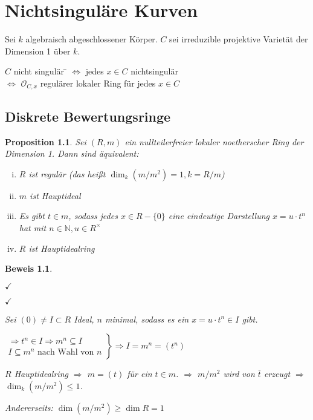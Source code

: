 \documentclass[a4paper, 12pt, numbers=noendperiod, chapterprefix=true, headsepline]{scrbook}
\theoremstyle{break}
\newtheorem{Prop}[Def]{Proposition}
\theoremstyle{nonumberbreak}
\newtheorem{Bew}{Beweis}
\theoremstyle{nonumberplain}
\newcommand{\N}{\mathbb{N}}
\newcommand{\calO}{\mathcal{O}}
\begin{document}
\newpage

\chapter{Nichtsingul\"are Kurven}
\setcounter{section}{19}
Sei $k$ algebraisch abgeschlossener K\"orper. $C$ sei irreduzible projektive Variet\"at der Dimension 1 \"uber $k$.
\begin{tabbing}
$C$ nicht singul\"ar \= $\Leftrightarrow$ jedes $x\in C$ nichtsingul\"ar\\
\> $\Leftrightarrow$ $\calO_{C,x}$ regul\"arer lokaler Ring f\"ur jedes $x\in C$
\end{tabbing}

\section{Diskrete Bewertungsringe}

\begin{Prop}\label{20.1}
Sei $(R,m)$ ein nullteilerfreier lokaler noetherscher Ring der Dimension 1. Dann sind \"aquivalent:\begin{enumerate}[i)]
\item
	$R$ ist regul\"ar (das hei\ss t $\dim_k(m/m^2)=1, k=R/m$)
\item
	$m$ ist Hauptideal
\item
	Es gibt $t\in m$, sodass jedes $x\in R-\{0\}$ eine eindeutige Darstellung $x=u\cdot t^n$ hat mit $n\in \N, u\in R^\times$
\item
	$R$ ist Hauptidealring
\end{enumerate}\end{Prop}

\begin{Bew}\begin{description}[\setlabelstyle{\normalfont}]
\item[(i)$\Rightarrow$(ii):]$\checkmark$
\item[(ii)$\Rightarrow$(iii):]$\checkmark$
\item[(iii)$\Rightarrow$(iv):]
	Sei $(0)\ne I\subset R$ Ideal, $n$ minimal, sodass es ein $x=u\cdot t^n\in I$ gibt.
	
	$\left.\begin{array}{l}\Rightarrow t^n\in I\Rightarrow m^n\subseteq I\\I\subseteq m^n\text{ nach Wahl von }n\end{array}\right\}\Rightarrow I=m^n=(t^n)$
\item[(iv)$\Rightarrow$(i):]
	$R$ Hauptidealring $\Rightarrow$ $m=(t)$ f\"ur ein $t\in m$. $\Rightarrow$ $m/m^2$ wird von $\overline t$ erzeugt $\Rightarrow$ $\dim_k(m/m^2)\le 1$.
	
	Andererseits: $\dim(m/m^2)\ge\dim R=1$
\end{description}\end{Bew}
\end{document}
